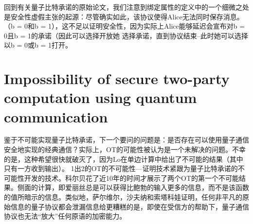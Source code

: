 回到有关量子比特承诺的原始论文，我们注意到绑定属性的定义中的一个细微之处是安全性虚假主张的起源：尽管确实如此，该协议使得Alice无法同时保存消息。 （b = 0和b = 1），这不足以证明安全性，因为实际上Alice能够延迟会宣布对b = 0且b = 1的承诺（因此可以选择开放她 选择承诺，直到协议结束–此时她可以选择以b = 0或b = 1打开。


\section{Impossibility of secure two-party computation using quantum communication}
鉴于不可能实现量子比特承诺，下一个要问的问题是：是否存在可以使用量子通信安全地实现的经典通信？实际上，OT的可能性被认为是一个未解决的问题\cite{Montrdal1996}。不幸的是，这种希望很快就破灭了，因为Lo\cite{Lo2008}在单边计算中给出了不可能的结果（其中只有一方收到输出）。 1出2的OT的不可能性—证明技术紧跟为量子比特承诺的不可能性开发的技术。科尔贝花了近10年的时间才展示了两个OT的第一个不可能结果。侧面的计算，即爱丽丝总是可以获得比鲍勃的输入更多的信息，而不是该函数的值所暗示的信息。类似地，萨尔维尔，沙夫纳和索塔科娃证明，任何非平凡的原始信息的量子协议都会泄漏信息给更糟糕的是，即使在受信方的帮助下，量子通信协议也无法“放大”任何原语的加密能力。

